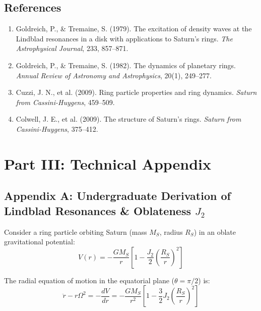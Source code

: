 \documentclass[11pt,a4paper]{article}
\begin{document}
\subsection*{References}
\begin{enumerate}
    \item Goldreich, P., \& Tremaine, S. (1979). The excitation of density waves at the Lindblad resonances in a disk with applications to Saturn's rings. \textit{The Astrophysical Journal}, 233, 857--871.
    \item Goldreich, P., \& Tremaine, S. (1982). The dynamics of planetary rings. \textit{Annual Review of Astronomy and Astrophysics}, 20(1), 249--277.
    \item Cuzzi, J. N., et al. (2009). Ring particle properties and ring dynamics. \textit{Saturn from Cassini-Huygens}, 459--509.
    \item Colwell, J. E., et al. (2009). The structure of Saturn's rings. \textit{Saturn from Cassini-Huygens}, 375--412.
\end{enumerate}

\newpage

\section*{Part III: Technical Appendix}

\subsection*{Appendix A: Undergraduate Derivation of Lindblad Resonances \& Oblateness $J_2$}

Consider a ring particle orbiting Saturn (mass $M_S$, radius $R_S$) in an oblate gravitational potential:
\begin{equation}
V(r) = -\frac{G M_S}{r} \left[ 1 - \frac{J_2}{2} \left( \frac{R_S}{r} \right)^2 \right]
\end{equation}

The radial equation of motion in the equatorial plane ($\theta = \pi/2$) is:
\begin{equation}
\ddot{r} - r \Omega^2 = -\frac{d V}{dr} = -\frac{G M_S}{r^2} \left[ 1 - \frac{3}{2} J_2 \left( \frac{R_S}{r} \right)^2 \right]
\end{equation}
\end{document}
